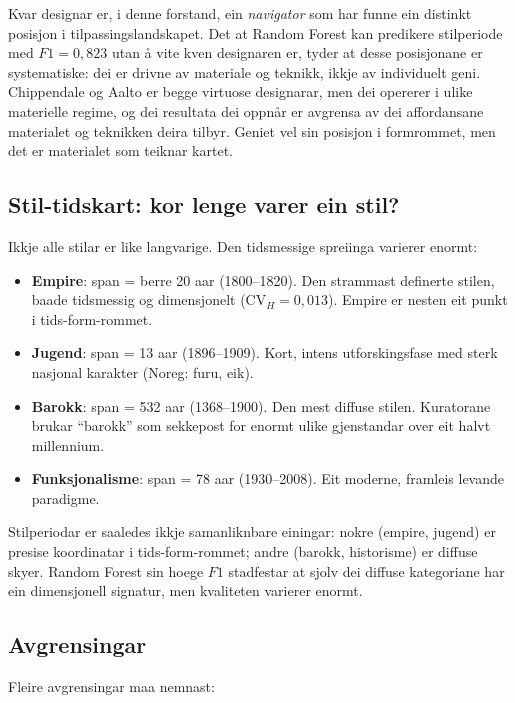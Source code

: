 \documentclass[10pt, a4paper, twocolumn]{article}
\begin{document}
Kvar designar er, i denne forstand, ein \emph{navigator} som har funne ein distinkt posisjon i tilpassingslandskapet. Det at Random Forest kan predikere stilperiode med $F1 = 0{,}823$ utan å vite kven designaren er, tyder at desse posisjonane er systematiske: dei er drivne av materiale og teknikk, ikkje av individuelt geni. Chippendale og Aalto er begge virtuose designarar, men dei opererer i ulike materielle regime, og dei resultata dei oppnår er avgrensa av dei affordansane materialet og teknikken deira tilbyr. Geniet vel sin posisjon i formrommet, men det er materialet som teiknar kartet.

\subsection{Stil-tidskart: kor lenge varer ein stil?}

Ikkje alle stilar er like langvarige. Den tidsmessige spreiinga varierer enormt:

\begin{itemize}
  \item \textbf{Empire}: span = berre 20 aar (1800--1820). Den strammast definerte stilen, baade tidsmessig og dimensjonelt ($\text{CV}_H = 0{,}013$). Empire er nesten eit punkt i tids-form-rommet.
  \item \textbf{Jugend}: span = 13 aar (1896--1909). Kort, intens utforskingsfase med sterk nasjonal karakter (Noreg: furu, eik).
  \item \textbf{Barokk}: span = 532 aar (1368--1900). Den mest diffuse stilen. Kuratorane brukar ``barokk'' som sekkepost for enormt ulike gjenstandar over eit halvt millennium.
  \item \textbf{Funksjonalisme}: span = 78 aar (1930--2008). Eit moderne, framleis levande paradigme.
\end{itemize}

Stilperiodar er saaledes ikkje samanliknbare einingar: nokre (empire, jugend) er presise koordinatar i tids-form-rommet; andre (barokk, historisme) er diffuse skyer. Random Forest sin hoege $F1$ stadfestar at sjolv dei diffuse kategoriane har ein dimensjonell signatur, men kvaliteten varierer enormt.

\subsection{Avgrensingar}

Fleire avgrensingar maa nemnast:
\end{document}
